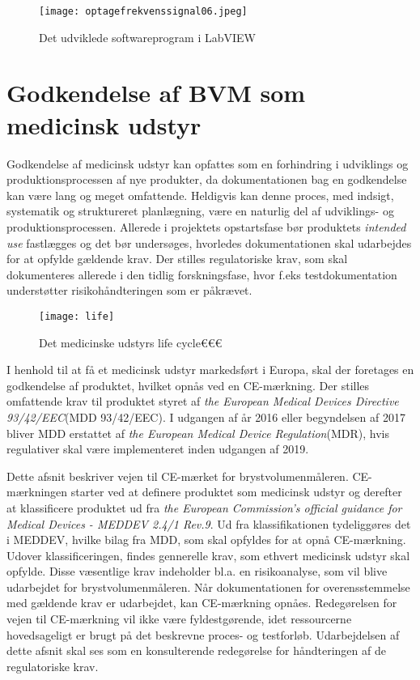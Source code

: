 { \begin{figure}[!h]	
\centering
\texttt{[image: optagefrekvenssignal06.jpeg]}
\caption{Det udviklede softwareprogram i LabVIEW}
\label{fig:VI06O}
 \end{figure}

 

\section{Godkendelse af BVM som medicinsk udstyr}
Godkendelse af medicinsk udstyr kan opfattes som en forhindring i udviklings og produktionsprocessen af nye produkter, da dokumentationen bag en godkendelse kan være lang og meget omfattende. Heldigvis kan denne proces, med indsigt, systematik og struktureret planlægning, være en naturlig del af udviklings- og produktionsprocessen. Allerede i projektets opstartsfase bør produktets \textit{intended use} fastlægges og det bør undersøges, hvorledes dokumentationen skal udarbejdes for at opfylde gældende krav.
Der stilles regulatoriske krav, som skal dokumenteres allerede i den tidlig forskningsfase, hvor f.eks testdokumentation understøtter risikohåndteringen som er påkrævet. 

\begin{figure}[htb]
\centering	
\texttt{[image: life]}
\caption{Det medicinske udstyrs life cycle€€€}
\label{fig:label}
\end{figure}

I henhold til at få et medicinsk udstyr markedsført i Europa, skal der foretages en godkendelse af produktet, hvilket opnås ved en CE-mærkning. Der stilles omfattende krav til produktet styret af \textit{the European Medical Devices Directive 93/42/EEC}{}(MDD 93/42/EEC). I udgangen af år 2016 eller begyndelsen af 2017 bliver MDD erstattet af \textit{the European Medical Device Regulation}{}(MDR), hvis regulativer skal være implementeret inden udgangen af 2019. 
  
Dette afsnit beskriver vejen til CE-mærket for brystvolumenmåleren. CE-mærkningen starter ved at definere produktet som medicinsk udstyr og derefter at klassificere produktet ud fra \textit{the European Commission's official guidance for Medical Devices - MEDDEV 2.4/1 Rev.9}. Ud fra klassifikationen tydeliggøres det i MEDDEV, hvilke bilag fra MDD, som skal opfyldes for at opnå CE-mærkning. 
Udover klassificeringen, findes gennerelle krav, som ethvert medicinsk udstyr skal opfylde. Disse væsentlige krav indeholder bl.a. en risikoanalyse, som vil blive udarbejdet for brystvolumenmåleren. 
Når dokumentationen for overensstemmelse med gældende krav er udarbejdet, kan CE-mærkning opnåes.
Redegørelsen for vejen til CE-mærkning vil ikke være fyldestgørende, idet ressourcerne hovedsageligt er brugt på det beskrevne proces- og testforløb. Udarbejdelsen af dette afsnit skal ses som en konsulterende redegørelse for håndteringen af de regulatoriske krav. 

}
